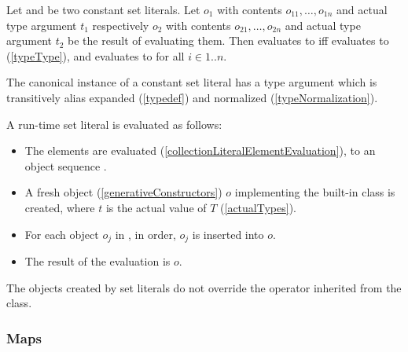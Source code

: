 \documentclass[makeidx]{article}
\begin{document}
{\LMHash{}%
Let 
and 
be two constant set literals.
Let $o_1$ with contents $o_{11}, \ldots, o_{1n}$ and actual type argument $t_1$
respectively
$o_2$ with contents $o_{21}, \ldots, o_{2n}$ and actual type argument $t_2$
be the result of evaluating them.
Then  evaluates to \TRUE{} if{}f
 evaluates to \TRUE{}
(\ref{typeType}),
and  evaluates to \TRUE{}
for all $i \in 1 .. n$.


\LMHash{}%
The canonical instance of a constant set literal has a type argument
which is transitively alias expanded
(\ref{typedef})
and normalized
(\ref{typeNormalization}).

\LMHash{}%
A run-time set literal 
is evaluated as follows:
\begin{itemize}
\item
  The elements  are evaluated
  (\ref{collectionLiteralElementEvaluation}),
  to an object sequence .
\item
  A fresh object (\ref{generativeConstructors}) $o$
  implementing the built-in class  is created,
  where $t$ is the actual value of $T$
  (\ref{actualTypes}).
\item
  For each object $o_j$ in , in order,
  $o_j$ is inserted into $o$.
\item
  The result of the evaluation is $o$.
\end{itemize}

\LMHash{}%
The objects created by set literals do not override
the \lit{==} operator inherited from the  class.


\subsubsection{Maps}

}
\end{document}
